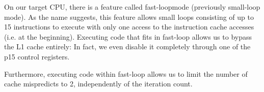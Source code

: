 On our target CPU, there is a feature called fast-loop\texttrademark mode
(previously small-loop mode). As the name suggests, this feature allows small
loops consisting of up to 15 instructions to execute with only one access to the
instruction cache accesses (i.e. at the beginning). Executing code that fits in
fast-loop allows us to bypass the L1 cache entirely: In fact, we even disable it
completely through one of the p15 control registers.

Furthermore, executing code within fast-loop allows us to limit the number of
cache mispredicts to 2, independently of the iteration count.
